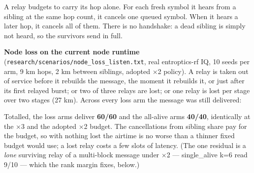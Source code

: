 \documentclass[10pt,letterpaper,twocolumn]{article}
\begin{document}
A relay budgets to carry its hop alone. For each fresh symbol it hears from a sibling at the same hop count, it cancels one queued symbol. When it hears a later hop, it cancels all of them. There is no handshake: a dead sibling is simply not heard, so the survivors send in full.

\textbf{Node loss on the current node runtime} (\texttt{research/\allowbreak{}scenarios/\allowbreak{}node\_\allowbreak{}loss\_\allowbreak{}listen.\allowbreak{}txt}, real entroptics-rf IQ, 10 seeds per arm, 9 km hops, 2 km between siblings, adopted ×2 policy). A relay is taken out of service before it rebuilds the message, the moment it rebuilds it, or just after its first relayed burst; or two of three relays are lost; or one relay is lost per stage over two stages (27 km). Across every loss arm the message was still delivered:


Totalled, the loss arms deliver \textbf{60/60} and the all-alive arms \textbf{40/40}, identically at the ×3 and the adopted ×2 budget. The cancellations from sibling share pay for the budget, so with nothing lost the airtime is no worse than a thinner fixed budget would use; a lost relay costs a few slots of latency. (The one residual is a \emph{lone} surviving relay of a multi-block message under ×2 --- single\_alive k=6 read 9/10 --- which the rank margin fixes, below.)
\end{document}
